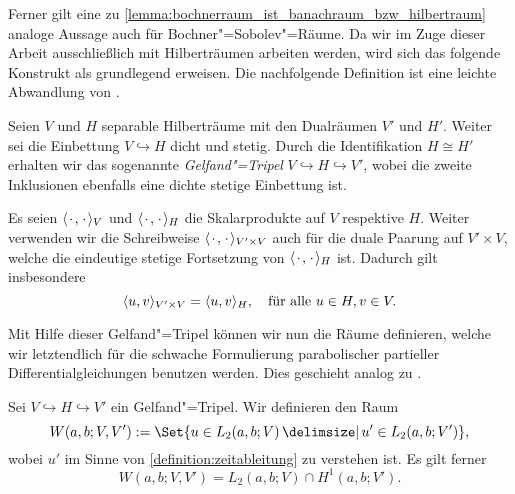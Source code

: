 \documentclass[../main.tex]{subfiles}
\begin{document}
Ferner gilt eine zu \cref{lemma:bochnerraum_ist_banachraum_bzw_hilbertraum} analoge Aussage auch für Bochner"=Sobolev"=Räume.
Da wir im Zuge dieser Arbeit ausschließlich mit Hilberträumen arbeiten werden, wird sich das folgende Konstrukt als grundlegend erweisen.
Die nachfolgende Definition ist eine leichte Abwandlung von \cite[Abschnitt 10.2]{Schweizer2013}.

\begin{Definition}
\label{definition:gelfand_tripel}
    Seien $V$ und $H$ separable Hilberträume mit den Dualräumen $V'$ und $H'$.
    Weiter sei die Einbettung $V \hookrightarrow H$ dicht und stetig.
    Durch die Identifikation $H \cong H'$ erhalten wir das sogenannte \emph{Gelfand"=Tripel} $V \hookrightarrow H \hookrightarrow V'$, wobei die zweite Inklusionen ebenfalls eine dichte stetige Einbettung ist.
\end{Definition}

\begin{Bemerkung}
\label{bemerkung:skalarprodukte_und_duality_pairing}
    Es seien $\skp{\blank}{\blank}{V}$ und $\skp{\blank}{\blank}{H}$ die Skalarprodukte auf $V$ respektive $H$.
    Weiter verwenden wir die Schreibweise $\skp{\blank}{\blank}{V' \times V}$ auch für die duale Paarung auf $V' \times V$, welche die eindeutige stetige Fortsetzung von $\skp{\blank}{\blank}{H}$ ist.
    Dadurch gilt insbesondere
    \begin{equation}
        \skp{u}{v}{V' \times V} = \skp{u}{v}{H}, \quad \fa u \in H, v \in V.
    \end{equation}
\end{Bemerkung}

Mit Hilfe dieser Gelfand"=Tripel können wir nun die Räume definieren, welche wir letztendlich für die schwache Formulierung parabolischer partieller Differentialgleichungen benutzen werden.
Dies geschieht analog zu \cite[Definition XVIII.2.4]{Dautray:1992by}.

\begin{Definition}
\label{definition:bochner_raum_W}
    Sei $V \hookrightarrow H \hookrightarrow V'$ ein Gelfand"=Tripel.
    Wir definieren den Raum
    \begin{equation}
        W(a, b; V, V') := \Set{u \in L_{2}(a, b; V) \given u' \in L_{2}(a, b; V')},
    \end{equation}
    wobei $u'$ im Sinne von \cref{definition:zeitableitung} zu verstehen ist.
    Es gilt ferner
    \begin{equation}
        W(a, b; V, V') = L_{2}(a, b; V) \cap H^{1}(a, b; V').
    \end{equation}
\end{Definition}
\end{document}
